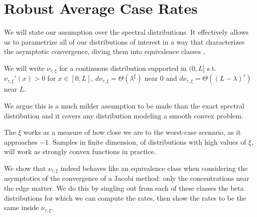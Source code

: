 \documentclass{article}
\begin{document}
\section{Robust Average Case Rates} \label{section: robust average}
We will state our assumption over the spectral distributions. It effectively allows us to parametrize all of our distributions of interest in a way that characterizes the asymptotic convergence, diving them into equivalence classes .

\begin{assumption}
We will write $\nu_{\tau,\xi}$ for a continuous distribution supported in $(0,L]$ s.t. $\nu_{\tau,\xi}'(x)>0$ for $x\in [0,L]$, $d\nu_{\tau,\xi}=\Theta( \lambda^\xi)$ near $0$ and $d\nu_{\tau,\xi}=\Theta( (L-\lambda)^\tau)$ near $L$. 
\label{assumption}
\end{assumption}

We argue this is a much milder assumption to be made than the exact spectral distribution and it covers any distribution modeling a smooth convex problem. 


The $\xi$ works as a measure of how close we are to the worst-case scenario, as it approaches $-1$. Samples in finite dimension, of distributions with high values of $\xi$, will work as strongly convex functions in practice.


We show that $\nu_{\tau,\xi}$ indeed behaves like an equivalence class when considering the asymptotics of the convergence of a Jacobi method: only the concentrations near the edge matter. We do this by singling out from each of these classes the beta distributions for which we can compute the rates, then show the rates to be the same inside $\nu_{\tau,\xi}$.
\end{document}
